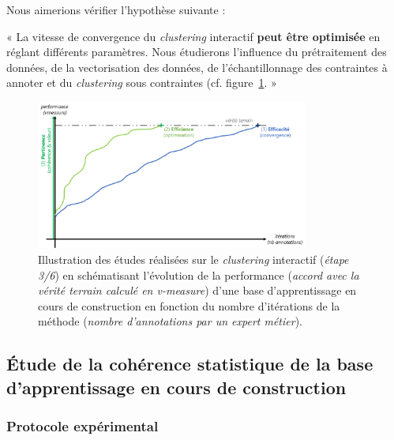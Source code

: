 		Nous aimerions vérifier l'hypothèse suivante :

		\begin{tcolorbox}[
			title=\textbf{Hypothèse de pertinence},
			colback=gray!20,
			colframe=gray!50!black!75,
			width=\linewidth
		]
			« La vitesse de convergence du \textit{clustering} interactif \textbf{peut être optimisée} en réglant différents paramètres. Nous étudierons l'influence du prétraitement des données, de la vectorisation des données, de l'échantillonnage des contraintes à annoter et du \textit{clustering} sous contraintes (cf. figure~\ref{figure:HYPOTHESE-PERTINENCE}. »
			
			
			\begin{figure}[H]
				\centering
				\includegraphics[width=0.8\textwidth]{figures/hypotheses-03-pertinence}
				\caption{Illustration des études réalisées sur le \textit{clustering} interactif (\textit{étape 3/6}) en schématisant l'évolution de la performance (\textit{accord avec la vérité terrain calculé en v-measure}) d'une base d'apprentissage en cours de construction en fonction du nombre d'itérations de la méthode (\textit{nombre d'annotations par un expert métier}).}
				\label{figure:HYPOTHESE-PERTINENCE}
			\end{figure}

		\end{tcolorbox}
		
		\subsection{Étude de la cohérence statistique de la base d'apprentissage en cours de construction}
		
			\subsubsection{Protocole expérimental}

